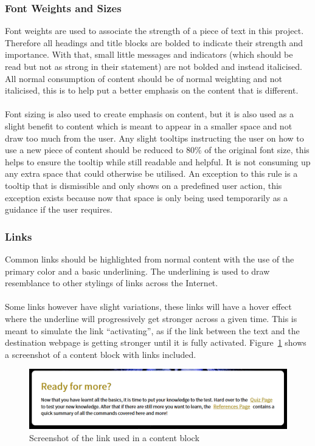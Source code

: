 \subsubsection{Font Weights and Sizes}
Font weights are used to associate the strength of a piece of text in this project. Therefore all headings and title blocks are bolded to indicate their strength and importance. With that, small little messages and indicators (which should be read but not as strong in their statement) are not bolded and instead italicised. All normal consumption of content should be of normal weighting and not italicised, this is to help put a better emphasis on the content that is different.\\\\
Font sizing is also used to create emphasis on content, but it is also used as a slight benefit to content which is meant to appear in a smaller space and not draw too much from the user. Any slight tooltips instructing the user on how to use a new piece of content should be reduced to 80\% of the original font size, this helps to ensure the tooltip while still readable and helpful. It is not consuming up any extra space that could otherwise be utilised. An exception to this rule is a tooltip that is dismissible and only shows on a predefined user action, this exception exists because now that space is only being used temporarily as a guidance if the user requires.

\subsubsection{Links}
Common links should be highlighted from normal content with the use of the primary color and a basic underlining. The underlining is used to draw resemblance to other stylings of links across the Internet.\\\\
Some links however have slight variations, these links will have a hover effect where the underline will progressively get stronger across a given time. This is meant to simulate the link ``activating'', as if the link between the text and the destination webpage is getting stronger until it is fully activated. Figure~\ref{fig:website} shows a screenshot of a content block with links included.

\begin{figure}
	\centering
	\includegraphics[width=0.8\linewidth]{web2}
	\caption{Screenshot of the link used in a content block}\label{fig:website}	
\end{figure}


